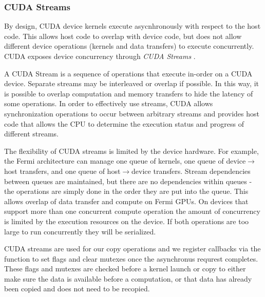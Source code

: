 
\subsubsection{CUDA Streams}
By design, CUDA device kernels execute asycnhronously with respect to the
host code. This allows host code to overlap with device code, but does not
allow different device operations (kernels and data transfers) to execute
concurrently. CUDA exposes device concurrency through \textit{CUDA Streams}
\cite{kirk2012programming}.

A CUDA Stream is a sequence of operations that
execute in-order on a CUDA device. Separate streams may be interleaved or
overlap if possible. In this way, it is possible to overlap computation and
memory transfers to hide the latency of some operations.
In order to effectively use streams, CUDA allows synchronization operations
to occur between arbitrary streams and provides host code that allows the
CPU to determine the execution status and progress of different streams.

The flexibility of CUDA streams is limited by the device hardware.
For example, the Fermi architecture can manage one queue of kernels, one queue
of device$\rightarrow$host transfers, and one queue of host$\rightarrow$device
transfers. Stream
dependencies between queues are maintained, but there are no dependencies
within queues - the operations are simply done in the order they are put into
the queue. This allows overlap of data transfer and compute on Fermi GPUs.
On devices that support more than one concurrent compute operation the amount
of concurrency is limited by the execution resources on the device. If both
operations are too large to run concurrently they will be serialized.


CUDA streams are used for our copy operations and we register callbacks via the  function to set flags and clear mutexes once
the asynchronus requrest completes.
These flags and mutexes are checked before a kernel launch or copy to either	make sure the data is available before a computation, or that data has
	already been copied and does not need to be recopied.

	

